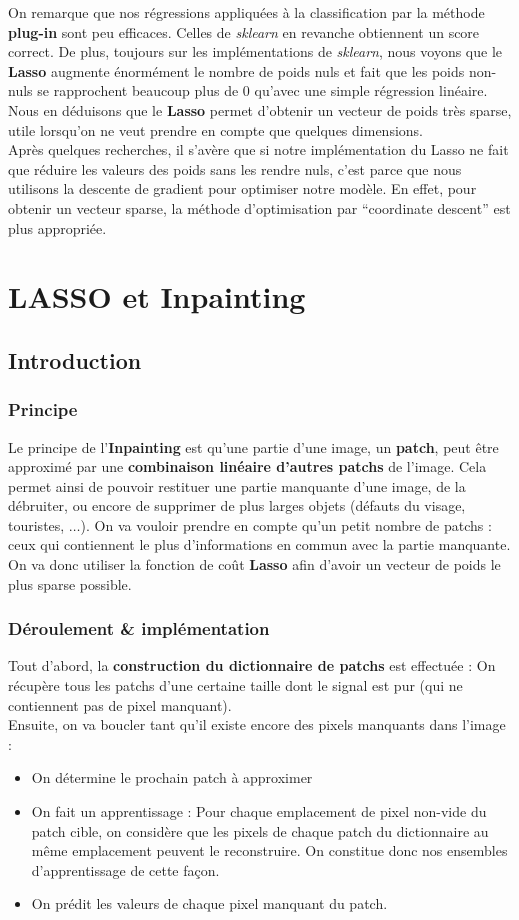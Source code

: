 \documentclass[a4paper]{memoir}
\begin{document}
On remarque que nos régressions appliquées à la classification par la méthode \textbf{plug-in} sont peu efficaces. Celles de \textit{sklearn} en revanche obtiennent un score correct. De plus, toujours sur les implémentations de \textit{sklearn}, nous voyons que le \textbf{Lasso} augmente énormément le nombre de poids nuls et fait que les poids non-nuls se rapprochent beaucoup plus de $0$ qu'avec une simple régression linéaire. Nous en déduisons que le \textbf{Lasso} permet d'obtenir un vecteur de poids très sparse, utile lorsqu'on ne veut prendre en compte que quelques dimensions.\\
Après quelques recherches, il s'avère que si notre implémentation du Lasso ne fait que réduire les valeurs des poids sans les rendre nuls, c'est parce que nous utilisons la descente de gradient pour optimiser notre modèle. En effet, pour obtenir un vecteur sparse, la méthode d'optimisation par ``coordinate descent'' est plus appropriée.


\section{LASSO et Inpainting}
\subsection{Introduction}
\subsubsection{Principe}
Le principe de l'\textbf{Inpainting} est qu'une partie d'une image, un \textbf{patch}, peut être approximé par une \textbf{combinaison linéaire d'autres patchs} de l'image. Cela permet ainsi de pouvoir restituer une partie manquante d'une image, de la débruiter, ou encore de supprimer de plus larges objets (défauts du visage, touristes, $\ldots$). On va vouloir prendre en compte qu'un petit nombre de patchs : ceux qui contiennent le plus d'informations en commun avec la partie manquante. On va donc utiliser la fonction de coût \textbf{Lasso} afin d'avoir un vecteur de poids le plus sparse possible.


\subsubsection{Déroulement \& implémentation}
Tout d'abord, la \textbf{construction du dictionnaire de patchs} est effectuée : On récupère tous les patchs d'une certaine taille dont le signal est pur (qui ne contiennent pas de pixel manquant).\\
Ensuite, on va boucler tant qu'il existe encore des pixels manquants dans l'image :
\begin{itemize}
\item On détermine le prochain patch à approximer
\item On fait un apprentissage : Pour chaque emplacement de pixel non-vide du patch cible, on considère que les pixels de chaque patch du dictionnaire au même emplacement peuvent le reconstruire. On constitue donc nos ensembles d'apprentissage de cette façon.
\item On prédit les valeurs de chaque pixel manquant du patch. 
\end{itemize}
\end{document}
